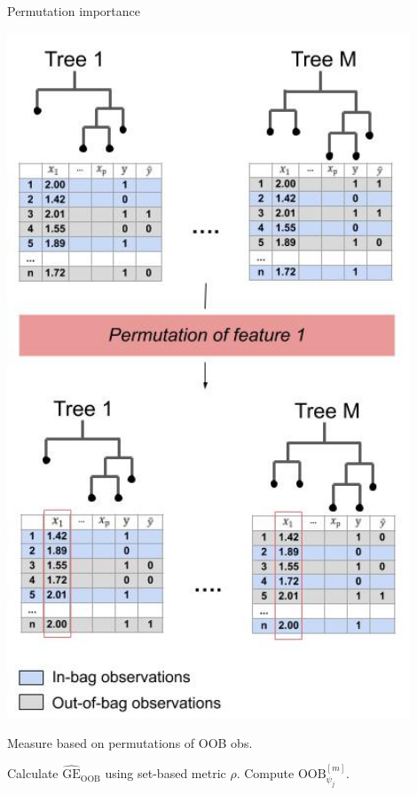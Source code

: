 \documentclass[11pt,compress,t,notes=noshow, xcolor=table]{beamer}
\begin{document}
\begin{vbframe}{Permutation importance}

\begin{minipage}[b]{0.35\textwidth}

\includegraphics[width = 0.9\textwidth]{figure_man/forests-featimp-new}
\end{minipage}%
\begin{minipage}[b]{0.65\textwidth}
\begin{algorithm}[H]
\scriptsize
\caption*{\small{Measure based on permutations of OOB obs.}}
\begin{algorithmic}[1]
  \State Calculate $\widehat{\mathrm{GE}}_{\text{OOB}}$ using set-based metric $\rho$.
    \State Compute {$\text{OOB}^{[m]}_{\psi_j}$.}
  \EndFor
\end{algorithmic}
\end{algorithm}
\end{minipage}

\end{vbframe}
\end{document}
